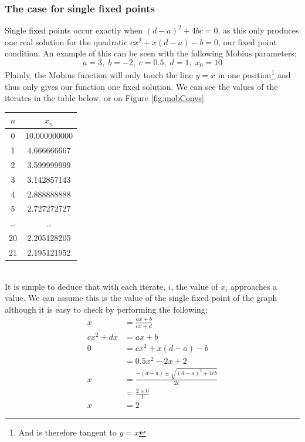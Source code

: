\documentclass[12pt]{article}
\begin{document}
\subsubsection{The case for single fixed points}\label{ss_sfix}
Single fixed points occur exactly when $(d-a)^2+4bc=0$, as this only produces one real solution for the quadratic $cx^2+x(d-a)-b=0$, our fixed point condition. An example of this can be seen with the following Mobius parameters;
	\[a=3,\;b=-2,\;c=0.5,\;d=1,\;x_0=10\]
Plainly, the Mobius function will only touch the line $y=x$ in one position\footnote{And is therefore tangent to $y=x$} and thus only gives our function one fixed solution. We can see the values of the iterates in the table below, or on Figure \ref{fig:mobConvs}
	\begin{table}[h]
		\begin{center}
			\begin{tabular}{|c|c|}
				\hline
				 $n$  &    $x_n$     \\ \hline\hline
				  0   & 10.000000000 \\ \hline
				  1   & 4.666666667  \\ \hline
				  2   & 3.599999999  \\ \hline
				  3   & 3.142857143  \\ \hline
				  4   & 2.888888888  \\ \hline
				  5   & 2.727272727  \\ \hline
				\dots &    \dots     \\ \hline
				 20   & 2.205128205  \\ \hline
				 21   & 2.195121952  \\ \hline
			\end{tabular}
		\end{center}
	\end{table} \\
It is simple to deduce that with each iterate, $i$, the value of $x_i$ approaches a value. We can assume this is the value of the single fixed point of the graph although it is easy to check by performing the following;
		\begin{equation*}
			\begin{split}
				x&=\frac{ax+b}{cx+d} \\[5pt]
				cx^2+dx&=ax+b \\[5pt]
				0&=cx^2+x(d-a)-b \\[5pt]
				&=0.5x^2-2x+2\\[5pt]
				x&=\frac{-(d-a)\pm\sqrt{(d-a)^2+4cb}}{2c}\\[5pt]
				&=\frac{2\pm0}{1}\\[5pt]
				x&=2
			\end{split}
		\end{equation*}
\end{document}
